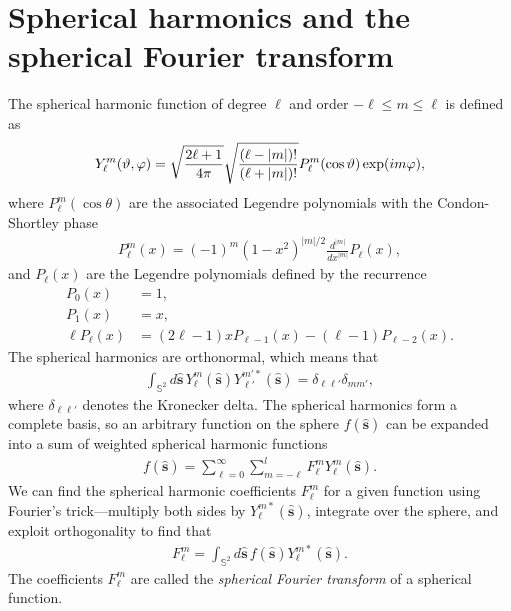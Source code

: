 \documentclass[]{osa-article}
\let\originalleft\left
\let\originalright\right
\renewcommand{\left}{\mathopen{}\mathclose\bgroup\originalleft}
\renewcommand{\right}{\aftergroup\egroup\originalright}
\providecommand{\mh}[1]{\mathbf{\hat{#1}}}
\providecommand{\mbb}[1]{\mathbb{#1}}
\begin{document}
\section{Spherical harmonics and the spherical Fourier transform}\label{sec:sph}
The spherical harmonic function of degree $\ell$ and order $-\ell \leq m \leq \ell$
is defined as \cite{schaeffer2013}
\begin{align}
Y_\ell^m(\vartheta, \varphi) = \sqrt{\frac{2\ell+1}{4\pi}}\sqrt{\frac{(\ell-|m|)!}{(\ell+|m|)!}}P_\ell^m\left(\cos\vartheta\right)\exp(i m \varphi),
\end{align}
where $P_\ell^m(\cos\theta)$ are the associated Legendre polynomials with the
Condon-Shortley phase
\begin{align}
  P_\ell^m(x) = (-1)^m(1-x^2)^{|m|/2}\frac{d^{|m|}}{dx^{|m|}}P_\ell(x),
\end{align}
and $P_\ell(x)$ are the Legendre polynomials defined by the recurrence
\begin{align}
  P_0(x) &= 1,\\
  P_1(x) &= x,\\
  \ell P_\ell(x) &= (2\ell-1)xP_{\ell-1}(x) - (\ell-1)P_{\ell-2}(x). 
\end{align}
The spherical harmonics are orthonormal, which means that
\begin{align}
  \int_{\mbb{S}^2}d\mh{s}\, Y_\ell^m(\mh{s}){Y}_{\ell'}^{m'*}(\mh{s}) = \delta_{\ell\ell'}\delta_{mm'},
\end{align}
where $\delta_{\ell\ell'}$ denotes the Kronecker delta. The spherical harmonics form a
complete basis, so an arbitrary function on the sphere $f(\mh{s})$ can be
expanded into a sum of weighted spherical harmonic functions
\begin{align}
  f(\mh{s}) = \sum_{\ell=0}^{\infty}\sum_{m=-\ell}^{l}F_\ell^mY_\ell^m(\mh{s}).
\end{align}
We can find the spherical harmonic coefficients $F_\ell^m$ for a given function
using Fourier's trick---multiply both sides by $Y_\ell^{m*}(\mh{s})$,
integrate over the sphere, and exploit orthogonality to find that
\begin{align}
  F_\ell^m = \int_{\mbb{S}^2}d\mh{s}\, f(\mh{s})Y_\ell^{m*}(\mh{s}).
\end{align}
The coefficients $F_\ell^m$ are called the \textit{spherical Fourier transform}
of a spherical function.
\end{document}
